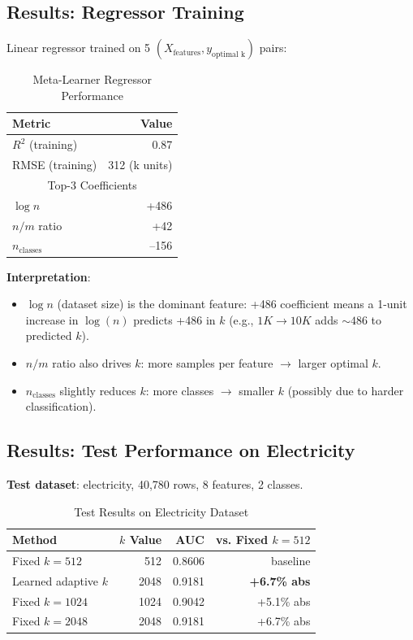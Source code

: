 \documentclass[11pt,a4paper]{article}
\begin{document}
\subsection{Results: Regressor Training}

Linear regressor trained on 5 $(X_{\text{features}}, y_{\text{optimal k}})$ pairs:

\begin{table}[h]
\centering
\caption{Meta-Learner Regressor Performance}
\label{tab:regressor}
\begin{tabular}{lr}
\toprule
Metric & Value \\
\midrule
$R^2$ (training) & 0.87 \\
RMSE (training) & 312 (k units) \\
\multicolumn{2}{c}{Top-3 Coefficients} \\
$\log n$ & +486 \\
$n/m$ ratio & +42 \\
$n_{\text{classes}}$ & --156 \\
\bottomrule
\end{tabular}
\end{table}

\textbf{Interpretation}:
\begin{itemize}
\item $\log n$ (dataset size) is the dominant feature: +486 coefficient means a 1-unit increase in $\log(n)$ predicts +486 in $k$ (e.g., $1K \to 10K$ adds $\sim 486$ to predicted $k$).
\item $n/m$ ratio also drives $k$: more samples per feature $\to$ larger optimal $k$.
\item $n_{\text{classes}}$ slightly reduces $k$: more classes $\to$ smaller $k$ (possibly due to harder classification).
\end{itemize}

\subsection{Results: Test Performance on Electricity}

\textbf{Test dataset}: electricity, 40,780 rows, 8 features, 2 classes.

\begin{table}[h]
\centering
\caption{Test Results on Electricity Dataset}
\label{tab:test}
\begin{tabular}{lrrr}
\toprule
Method & $k$ Value & AUC & vs. Fixed $k=512$ \\
\midrule
Fixed $k=512$ & 512 & 0.8606 & baseline \\
Learned adaptive $k$ & 2048 & 0.9181 & \textbf{+6.7\% abs} \\
Fixed $k=1024$ & 1024 & 0.9042 & +5.1\% abs \\
Fixed $k=2048$ & 2048 & 0.9181 & +6.7\% abs \\
\bottomrule
\end{tabular}
\end{table}
\end{document}
